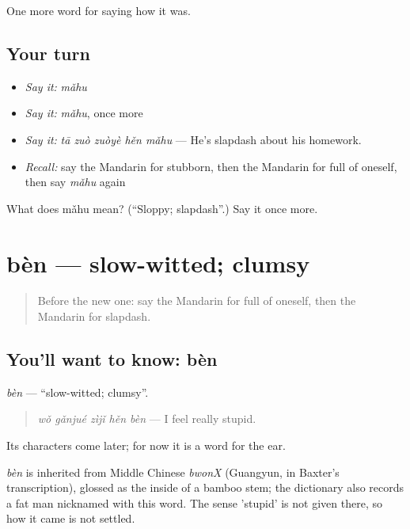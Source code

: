 \begin{grammarlens}[title={What you've built}]
One more word for saying how it was.
\end{grammarlens}

\subsection*{Your turn}
\begin{itemize}
\raggedright
  \item \emph{Say it:} \emph{mǎhu}
  \item \emph{Say it:} \emph{mǎhu}, once more
  \item \emph{Say it:} \emph{tā zuò zuòyè hěn mǎhu} — He's slapdash about his homework.
  \item \emph{Recall:} say the Mandarin for stubborn, then the Mandarin for full of oneself, then say \emph{mǎhu} again
\end{itemize}

\begin{tcolorbox}[breakable,colback=teal!4,colframe=teal!35!black,title={Before you move on}]
What does mǎhu mean? (\textquotedblleft{}Sloppy; slapdash\textquotedblright{}.) Say it once more.
\end{tcolorbox}
\section[bèn]{bèn — slow-witted; clumsy}

\label{lesson:ZH-C470-ben}



\begin{quote}
Before the new one: say the Mandarin for full of oneself, then the Mandarin for slapdash.
\end{quote}

\subsection*{You'll want to know: bèn}
\emph{bèn} — \textquotedblleft{}slow-witted; clumsy\textquotedblright{}.

\begin{quote}
\emph{wǒ gǎnjué zìjǐ hěn bèn} — I feel really stupid.
\end{quote}

Its characters come later; for now it is a word for the ear.

\begin{cousinweb}
\emph{bèn} is inherited from Middle Chinese \emph{bwonX} (Guangyun, in Baxter's transcription), glossed as the inside of a bamboo stem; the dictionary also records a fat man nicknamed with this word. The sense 'stupid' is not given there, so how it came is not settled.
\end{cousinweb}

